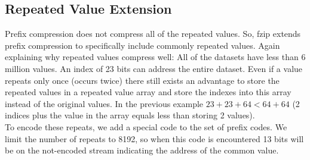 \subsection{Repeated Value Extension}
Prefix compression does not compress all of the repeated values. So, fzip extends prefix compression to specifically include commonly repeated values. Again explaining why repeated values compress well: All of the datasets have less than 6 million values. An index of 23 bits can address the entire dataset. Even if a value repeats only once (occurs twice) there still exists an advantage to store the repeated values in a repeated value array and store the indexes into this array instead of the original values. In the previous example $23+23+64<64+64$ (2 indices plus the value in the array equals less than storing 2 values).\\
\indent To encode these repeats, we add a special code to the set of prefix codes. We limit the number of repeats to 8192, so when this code is encountered 13 bits will be on the not-encoded stream indicating the address of the common value.

